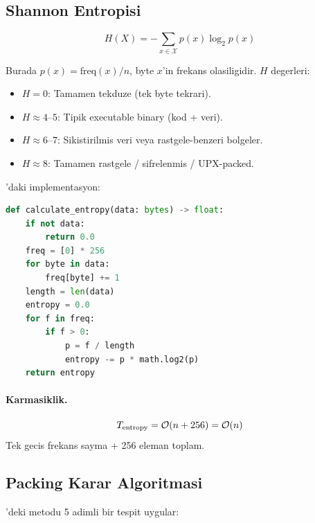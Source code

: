 \subsection{Shannon Entropisi}

\begin{equation}
\label{eq:shannon-entropy}
H(X) = -\sum_{x \in \mathcal{X}} p(x) \log_2 p(x)
\end{equation}

Burada $p(x) = \text{freq}(x) / n$, byte $x$'in frekans olasiligidir. $H$ degerleri:

\begin{itemize}
\item $H = 0$: Tamamen tekduze (tek byte tekrari).
\item $H \approx 4$--$5$: Tipik executable binary (kod + veri).
\item $H \approx 6$--$7$: Sikistirilmis veri veya rastgele-benzeri bolgeler.
\item $H \approx 8$: Tamamen rastgele / sifrelenmis / UPX-packed.
\end{itemize}

'daki implementasyon:
\begin{lstlisting}[language=Python, caption={Shannon entropy hesaplama}]
def calculate_entropy(data: bytes) -> float:
    if not data:
        return 0.0
    freq = [0] * 256
    for byte in data:
        freq[byte] += 1
    length = len(data)
    entropy = 0.0
    for f in freq:
        if f > 0:
            p = f / length
            entropy -= p * math.log2(p)
    return entropy
\end{lstlisting}

\paragraph{Karmasiklik.}
\begin{equation}
\label{eq:entropy-complexity}
T_{\text{entropy}} = \mathcal{O}\!\left(n + 256\right) = \mathcal{O}\!\left(n\right)
\end{equation}
Tek gecis frekans sayma + 256 eleman toplam.

\subsection{Packing Karar Algoritmasi}

'deki  metodu 5 adimli bir tespit uygular:

